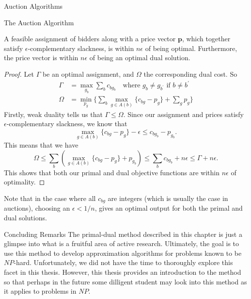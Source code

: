 \begin{section}{Auction Algorithms}
\begin{subsection}{The Auction Algorithm}
		\begin{theorem}
			A feasible assignment of bidders along with a price vector $\mathbf{p}$, 
			which together satisfy $\epsilon$-complementary slackness, 
			is within $n\epsilon$ of being optimal. 
			Furthermore, the price vector is within $n\epsilon$ of being an optimal dual 
			solution.
		\end{theorem}
		\begin{proof}
			Let $\Gamma$ be an optimal assignment, and $\Omega$ the corresponding dual cost. 
			So 
			\begin{align}
				\Gamma &= \max_{g_b} \sum_b c_{bg_b} \quad \text{where $g_b\neq 
				g_{b^{'}}$ if $b\neq b^{'}$}\\
				\Omega &= \min_{p_g} \{\sum_b \max_{g\in A(b)} \{c_{bg} - p_g\} + 
				\sum_g p_g\}
			\end{align}
			Firstly, weak duality tells us that $\Gamma \leq \Omega$. Since our assignment 
			and prices satisfy $\epsilon$-complementary slackness, we know that 
			\[
				\max_{g\in A(b)} \{c_{bg} - p_g\} - \epsilon \leq c_{bg_b} - p_{g_b}.
			\]
			This means that we have 
			\[
				\Omega \leq \sum_b \left(\max_{g\in A(b)} \{c_{bg} - p_g\} + p_{g_b} 
				\right) \leq \sum_b c_{bg_b} + n\epsilon \leq \Gamma + n\epsilon.
			\]
			This shows that both our primal and dual objective functions are within 
			$n\epsilon$ of optimality.
		\end{proof}
		Note that in the case where all $c_{bg}$ are integers (which is usually the case in 
		auctions), choosing an $\epsilon < 1/n$, gives an optimal output for both the primal 
		and dual solutions.
\end{subsection}
\end{section}
\begin{section}{Concluding Remarks}
The primal-dual method described in this chapter is just a glimpse into what is a fruitful area of 
active research. Ultimately, the goal is to use this method to develop approximation algorithms 
for problems known to be $NP$-hard. Unfortunately, we did not have the time to thoroughly explore 
this facet in this thesis. However, this thesis provides an introduction to the method so that 
perhaps in the future some dilligent student may look into this method as it applies to problems in 
$NP$.
\end{section}
